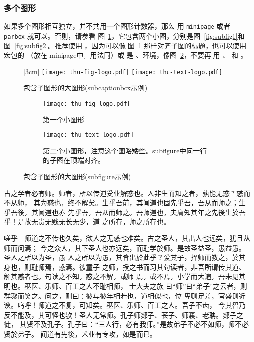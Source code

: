 \subsubsection{多个图形}
\label{sec:multifig}

如果多个图形相互独立，并不共用一个图形计数器，那么
用 \texttt{minipage} 或者\texttt{parbox} 就可以。否则，请参看
图~\ref{fig:big1-subcaptionbox}，它包含两个小图，分别是图~\ref{fig:subfig1}和
图~\ref{fig:subfig2}。推荐使用 ，因为可以像
图~\ref{fig:big1-subcaptionbox} 那样对齐子图的标题，也可以使用 
宏包的 （放在 minipage中，用法同）或
是  、环境，像图~\ref{fig:big1-subfigure}，不要再
用 、 和 。

\begin{figure}[h]
  \centering%
  [3cm] %
    {\texttt{[image: thu-fig-logo.pdf]}}%
  \hspace{4em}%
      {\texttt{[image: thu-text-logo.pdf]}}
  \caption{包含子图形的大图形(subcaptionbox示例)}
  \label{fig:big1-subcaptionbox}
\end{figure}
\begin{figure}[h]
  \centering%
  \begin{subfigure}{3cm}
    \texttt{[image: thu-fig-logo.pdf]}
    \caption{第一个小图形}
  \end{subfigure}%
  \hspace{4em}%
  \begin{subfigure}{0.5\textwidth}
    \texttt{[image: thu-text-logo.pdf]}
    \caption{第二个小图形，注意这个图略矮些。subfigure中同一行的子图在顶端对齐。}
  \end{subfigure}
  \caption{包含子图形的大图形(subfigure示例)}
  \label{fig:big1-subfigure}
\end{figure}

古之学者必有师。师者，所以传道受业解惑也。人非生而知之者，孰能无惑？惑而不从师，
其为惑也，终不解矣。生乎吾前，其闻道也固先乎吾，吾从而师之；生乎吾後，其闻道也亦
先乎吾，吾从而师之。吾师道也，夫庸知其年之先後生於吾乎！是故无贵无贱无长无少，道
之所存，师之所存也。

嗟乎！师道之不传也久矣，欲人之无惑也难矣。古之圣人，其出人也远矣，犹且从师而问焉；
今之众人，其下圣人也亦远矣，而耻学於师。是故圣益圣，愚益愚。圣人之所以为圣，愚
人之所以为愚，其皆出於此乎？爱其子，择师而教之，於其身也，则耻师焉，惑焉。彼童子
之师，授之书而习其句读者，非吾所谓传其道、解其惑者也。句读之不知，惑之不解，或师
焉，或不焉，小学而大遗，吾未见其明也。巫医、乐师、百工之人不耻相师，  士大夫之族
曰“师”曰“弟子”之云者，则群聚而笑之。问之，则曰：彼与彼年相若也，道相似也，位
卑则足羞，官盛则近谀。呜呼！师道之不复，可知矣。巫医、乐师、百工之人。吾子不齿，
今其智乃反不能及，其可怪也欤！圣人无常师。孔子师郯子、苌子、师襄、老聃。郯子之徒，
其贤不及孔子。孔子曰：“三人行，必有我师。”是故弟子不必不如师，师不必贤於弟子。
闻道有先後，术业有专攻，如是而已。


